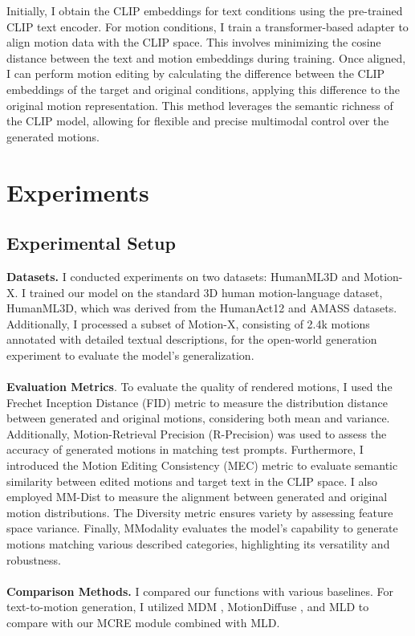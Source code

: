 \documentclass[a4paper, 12pt]{article}
\begin{document}
Initially, I obtain the CLIP embeddings for text conditions using the pre-trained CLIP text encoder. For motion conditions, I train a transformer-based adapter to align motion data with the CLIP space. This involves minimizing the cosine distance between the text and motion embeddings during training. Once aligned, I can perform motion editing by calculating the difference between the CLIP embeddings of the target and original conditions, applying this difference to the original motion representation. This method leverages the semantic richness of the CLIP model, allowing for flexible and precise multimodal control over the generated motions.

\newpage 



\section{Experiments}
\subsection{Experimental Setup}
\textbf{Datasets.} I conducted experiments on two datasets: HumanML3D \cite{9880214} and Motion-X. I trained our model on the standard 3D human motion-language dataset, HumanML3D, which was derived from the HumanAct12 and AMASS datasets. Additionally, I processed a subset of Motion-X, consisting of 2.4k motions annotated with detailed textual descriptions, for the open-world generation experiment to evaluate the model's generalization.\\
\\
\textbf{Evaluation Metrics}. To evaluate the quality of rendered motions, I used the Frechet Inception Distance (FID) metric to measure the distribution distance between generated and original motions, considering both mean and variance. Additionally, Motion-Retrieval Precision (R-Precision) was used to assess the accuracy of generated motions in matching test prompts. Furthermore, I introduced the Motion Editing Consistency (MEC) metric to evaluate semantic similarity between edited motions and target text in the CLIP space. I also employed MM-Dist to measure the alignment between generated and original motion distributions. The Diversity metric \cite{9880214} ensures variety by assessing feature space variance. Finally, MModality evaluates the model's capability to generate motions matching various described categories, highlighting its versatility and robustness.\\
\\
\textbf{Comparison Methods.} I compared our functions with various baselines. For text-to-motion generation, I utilized MDM \cite{tevet2022human}, MotionDiffuse \cite{zhang2024motiondiffuse}, and MLD \cite{chen2023executing} to compare with our MCRE module combined with MLD.\\
\end{document}
